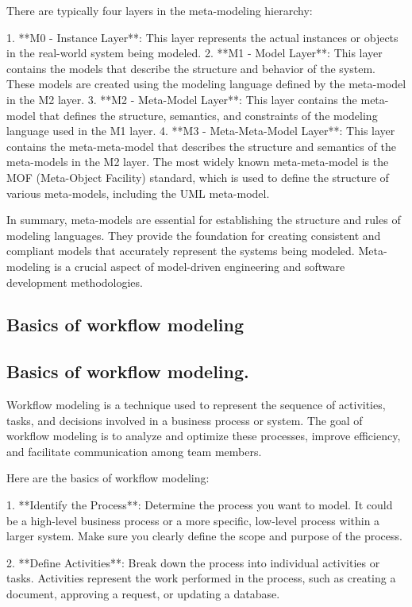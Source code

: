 \documentclass{article}
\begin{document}
There are typically four layers in the meta-modeling hierarchy:

1. **M0 - Instance Layer**: This layer represents the actual instances or objects in the real-world system being modeled.
2. **M1 - Model Layer**: This layer contains the models that describe the structure and behavior of the system. These models are created using the modeling language defined by the meta-model in the M2 layer.
3. **M2 - Meta-Model Layer**: This layer contains the meta-model that defines the structure, semantics, and constraints of the modeling language used in the M1 layer.
4. **M3 - Meta-Meta-Model Layer**: This layer contains the meta-meta-model that describes the structure and semantics of the meta-models in the M2 layer. The most widely known meta-meta-model is the MOF (Meta-Object Facility) standard, which is used to define the structure of various meta-models, including the UML meta-model.

In summary, meta-models are essential for establishing the structure and rules of modeling languages. They provide the foundation for creating consistent and compliant models that accurately represent the systems being modeled. Meta-modeling is a crucial aspect of model-driven engineering and software development methodologies.


\subsection{Basics of workflow modeling}
\subsection{Basics of workflow modeling.}

Workflow modeling is a technique used to represent the sequence of activities, tasks, and decisions involved in a business process or system. The goal of workflow modeling is to analyze and optimize these processes, improve efficiency, and facilitate communication among team members.

Here are the basics of workflow modeling:

1. **Identify the Process**: Determine the process you want to model. It could be a high-level business process or a more specific, low-level process within a larger system. Make sure you clearly define the scope and purpose of the process.

2. **Define Activities**: Break down the process into individual activities or tasks. Activities represent the work performed in the process, such as creating a document, approving a request, or updating a database.
\end{document}
